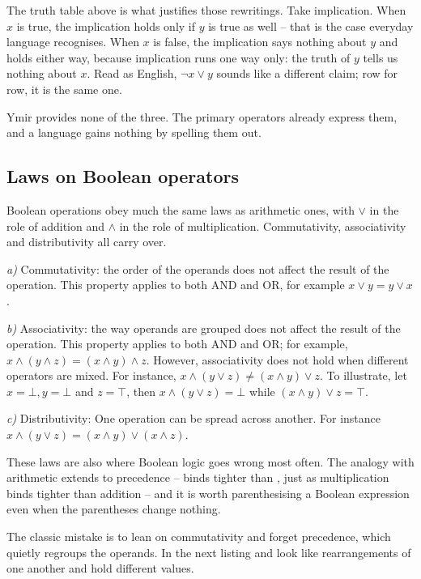 


The truth table above is what justifies those rewritings. Take implication. When
$x$ is true, the implication holds only if $y$ is true as well -- that is the
case everyday language recognises. When $x$ is false, the implication says
nothing about $y$ and holds either way, because implication runs one way only:
the truth of $y$ tells us nothing about $x$. Read as English, $\lnot x \lor y$
sounds like a different claim; row for row, it is the same one.

Ymir provides none of the three. The primary operators already express them, and
a language gains nothing by spelling them out.

\subsection{Laws on Boolean operators}

Boolean operations obey much the same laws as arithmetic ones, with $\lor$ in the
role of addition and $\land$ in the role of multiplication. Commutativity,
associativity and distributivity all carry over.

\textit{a)} Commutativity: the order of the operands does not affect the result of the
operation. This property applies to both AND and OR, for example $x \lor y =
y \lor x$.
\smallskip

\textit{b)} Associativity: the way operands are grouped does not affect the result of the
operation. This property applies to both AND and OR; for example, $x \land
(y \land z) = (x \land y) \land z$. However, associativity does not hold when
different operators are mixed. For instance, $x \land (y \lor z) \neq (x \land
y) \lor z$. To illustrate, let $x = \bot, y = \bot$ and $z = \top$, then
$x \land (y \lor z) = \bot$ while $(x \land y) \lor z = \top$.
\smallskip

\textit{c)} Distributivity: One operation can be spread across another. For instance
$x \land (y \lor z) = (x \land y) \lor (x \land z)$.

These laws are also where Boolean logic goes wrong most often. The analogy with
arithmetic extends to precedence -- \token{&&} binds tighter than \token{||},
just as multiplication binds tighter than addition -- and it is worth
parenthesising a Boolean expression even when the parentheses change nothing.

The classic mistake is to lean on commutativity and forget precedence, which
quietly regroups the operands. In the next listing  and  look
like rearrangements of one another and hold different values.

